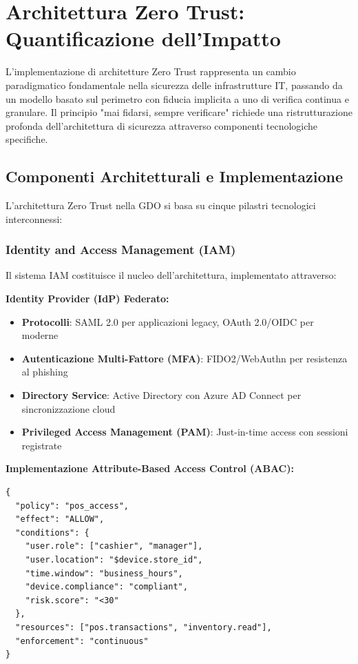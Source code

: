 \section{Architettura Zero Trust: Quantificazione dell'Impatto}

L'implementazione di architetture Zero Trust rappresenta un cambio paradigmatico fondamentale nella sicurezza delle infrastrutture IT, passando da un modello basato sul perimetro con fiducia implicita a uno di verifica continua e granulare. Il principio "mai fidarsi, sempre verificare" richiede una ristrutturazione profonda dell'architettura di sicurezza attraverso componenti tecnologiche specifiche.

\subsection{Componenti Architetturali e Implementazione}

L'architettura Zero Trust nella GDO si basa su cinque pilastri tecnologici interconnessi:

\subsubsection{Identity and Access Management (IAM)}

Il sistema IAM costituisce il nucleo dell'architettura, implementato attraverso:

\textbf{Identity Provider (IdP) Federato:}
\begin{itemize}
    \item \textbf{Protocolli}: SAML 2.0 per applicazioni legacy, OAuth 2.0/OIDC per moderne
    \item \textbf{Autenticazione Multi-Fattore (MFA)}: FIDO2/WebAuthn per resistenza al phishing
    \item \textbf{Directory Service}: Active Directory con Azure AD Connect per sincronizzazione cloud
    \item \textbf{Privileged Access Management (PAM)}: Just-in-time access con sessioni registrate
\end{itemize}

\textbf{Implementazione Attribute-Based Access Control (ABAC):}
\begin{lstlisting}[caption={Policy ABAC per accesso POS},label={lst:abac_policy}]
{
  "policy": "pos_access",
  "effect": "ALLOW",
  "conditions": {
    "user.role": ["cashier", "manager"],
    "user.location": "$device.store_id",
    "time.window": "business_hours",
    "device.compliance": "compliant",
    "risk.score": "<30"
  },
  "resources": ["pos.transactions", "inventory.read"],
  "enforcement": "continuous"
}
\end{lstlisting}

